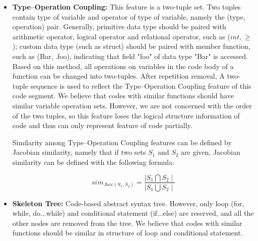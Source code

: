 \begin{itemize}
	\item \textbf{Type–Operation Coupling:} This feature is a two-tuple set. Two tuples contain type of variable and operator of type of variable, namely the (type, operation) pair. Generally, primitive data type should be paired with arithmetic operator, logical operator and relational operator, such as ($int, \geq$); custom data type (such as struct) should be paired with member function, such as (Bar, .foo), indicating that field "foo" of data type "Bar" is accessed. Based on this method, all operations on variables in the code body of a function can be changed into two-tuples. After repetition removal, A two-tuple sequence is used to reflect the Type–Operation Coupling feature of this code segment. We believe that codes with similar functions should have similar variable operation sets. However, we are not concerned with the order of the two tuples, so this feature loses the logical structure information of code and thus can only represent feature of code partially.
	
	
	Similarity among Type–Operation Coupling features can be defined by Jacobian similarity, namely that if two sets $S_1$ and $S_2$ are given, Jacobian similarity can be defined with the following formula:
	
	
	\begin{equation}
	sim_{Jacc(S_{1}, S_{2})}=\frac{\mid S_{1}\bigcap S_{2}\mid}{\mid S_{1}\bigcup S_{2}\mid}
	\end{equation}
	
	\item \textbf{Skeleton Tree:} Code-based abstract syntax tree. However, only loop (for, while, do...while) and conditional statement (if...else) are reserved, and all the other nodes are removed from the tree. We believe that codes with similar functions should be similar in structure of loop and conditional statement.
	

\end{itemize}
